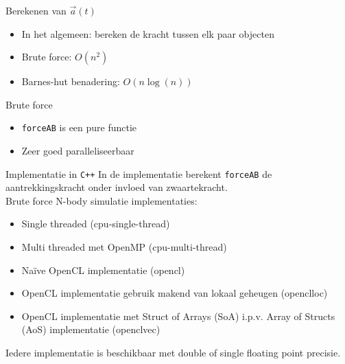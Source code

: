 \documentclass{beamer}
\begin{document}
	\begin{frame}{Berekenen van $\vec{a}(t)$}
		\begin{itemize}
			\item In het algemeen: bereken de kracht tussen elk paar objecten
			\item Brute force: $O(n^2)$
			\item Barnes-hut benadering: $O(n\log(n))$
		\end{itemize}
	\end{frame}
	
	\begin{frame}{Brute force}
		\codeBF
		\begin{itemize}
			\item \texttt{forceAB} is een pure functie
			\item Zeer goed paralleliseerbaar
		\end{itemize}
	\end{frame}
	
	
	\begin{frame}{Implementatie in \texttt{C++}}
		In de implementatie berekent \texttt{forceAB} de aantrekkingskracht onder invloed van zwaartekracht.
		\\
		Brute force N-body simulatie implementaties:
		\begin{itemize}
			\item Single threaded (cpu-single-thread)
			\item Multi threaded met OpenMP (cpu-multi-thread)
			\item Na\"ive OpenCL implementatie (opencl)
			\item OpenCL implementatie gebruik makend van lokaal geheugen (openclloc)
			\item OpenCL implementatie met Struct of Arrays (SoA) i.p.v. Array of Structs (AoS) implementatie (openclvec)
		\end{itemize}
		Iedere implementatie is beschikbaar met double of single floating point precisie.
	\end{frame}
	
\end{document}
